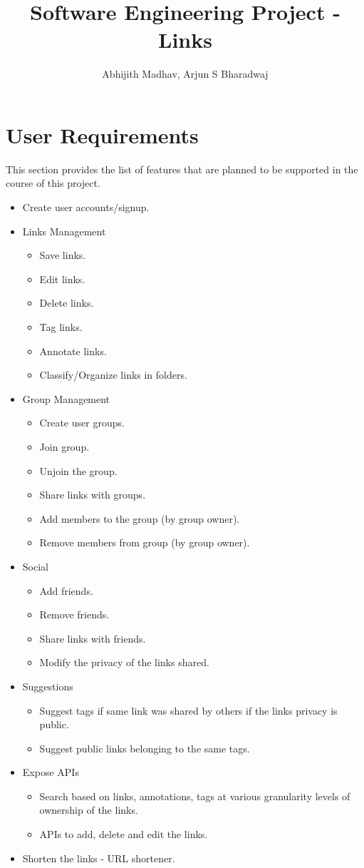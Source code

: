 \documentclass[11pt]{report} %
\title{Software Engineering Project - Links}
\author{Abhijith Madhav, Arjun S Bharadwaj}
\begin{document}
\maketitle
\section*{User Requirements}
This section provides the list of features that are planned to be supported in the course of this project.
\begin{itemize}
\item
	Create user accounts/signup.
\item
Links Management
\begin{itemize}
	\item
		Save links.
	\item
		Edit links.
	\item
		Delete links.
	\item
		Tag links.
	\item
		Annotate links.
	\item
		Classify/Organize links in folders.
\end{itemize}
\item
Group Management
\begin{itemize}
	\item
		Create user groups.
	\item
		Join group.
	\item
		Unjoin the group.
	\item
		Share links with groups.
	\item
		Add members to the group (by group owner).
	\item
		Remove members from group (by group owner).
\end{itemize}
\item
Social
\begin{itemize}
	\item
		Add friends.
	\item
		Remove friends.
	\item
		Share links with friends.
	\item
		Modify the privacy of the links shared.
\end{itemize}
\item
Suggestions
\begin{itemize}
	\item
		Suggest tags if same link was shared by others if the links privacy is public.
	\item
		Suggest public links belonging to the same tags.
\end{itemize}
\item
Expose APIs
\begin{itemize}
	\item
	Search based on links, annotations, tags at various granularity levels of ownership of the links.
	\item
	APIs to add, delete and edit the links.
\end{itemize}
\item
Shorten the links - URL shortener.
\end{itemize}
\end{document}
